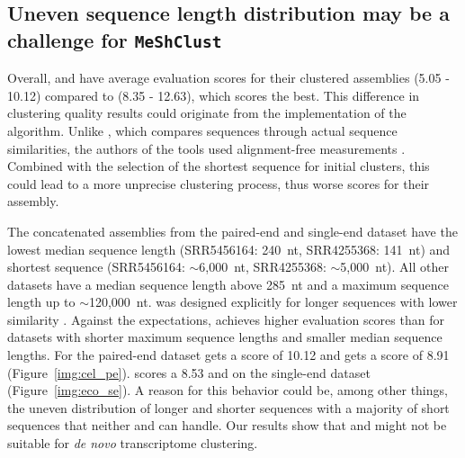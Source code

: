 \documentclass[12pt,a4paper,english]{article}
\begin{document}
	\subsection{Uneven sequence length distribution may be a challenge for \texttt{MeShClust}}
		Overall, \mclust and \mclusttwo have average evaluation scores for their clustered assemblies (5.05 - 10.12) compared to \cdhit (8.35 - 12.63), which scores the best. This difference in clustering quality results could originate from the implementation of the \mclust algorithm. Unlike \cdhit, which compares sequences through actual sequence similarities, the authors of the tools used alignment-free measurements \citep{meshclust:18}. Combined with the selection of the shortest sequence for initial clusters, this could lead to a more unprecise clustering process, thus worse scores for their assembly.
    
	
	    The concatenated assemblies from the paired-end \celegans and single-end \ecoli dataset have the lowest median sequence length (SRR5456164: 240~nt, SRR4255368: 141~nt) and shortest sequence (SRR5456164: $\sim$6,000~nt, SRR4255368: $\sim$5,000~nt). All other datasets have a median sequence length above 285~nt and a maximum sequence length up to $\sim$120,000~nt.
		\mclusttwo was designed explicitly for longer sequences with lower similarity \citep{meshclust2:18}. Against the expectations, \mclusttwo achieves higher evaluation scores than \mclust for datasets with shorter maximum sequence lengths and smaller median sequence lengths.
		For the paired-end \celegans dataset \mclusttwo gets a score of 10.12 and \mclust gets a score of 8.91 (Figure~\ref{img:cel_pe}). \mclusttwo scores a 8.53 and  on the single-end \ecoli dataset (Figure~\ref{img:eco_se}).
		A reason for this behavior could be, among other things, the uneven distribution of longer and shorter sequences with a majority of short sequences that neither \mclust and \mclusttwo can handle.
		Our results show that \mclust and \mclusttwo might not be suitable for \textit{de novo} transcriptome clustering.
	
\end{document}
